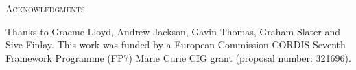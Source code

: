 \documentclass[12pt,letterpaper]{article}
\renewcommand{\section}[1]{%
\bigskip
\begin{center}
\begin{Large}
\normalfont\scshape #1
\medskip
\end{Large}
\end{center}}
\begin{document}

\section{Acknowledgments}
Thanks to Graeme Lloyd, Andrew Jackson, Gavin Thomas, Graham Slater and Sive Finlay.
This work was funded by a European Commission CORDIS Seventh Framework Programme (FP7) Marie Curie CIG grant (proposal number: 321696).




\end{document}
